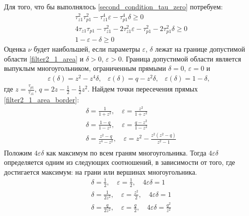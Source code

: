 \documentclass[a4paper,14pt]{article} %
\begin{document}
Для того, что бы выполнялось \eqref{second_condition_tau_zero} потребуем: 
 \begin{equation}\label{filter2_1_area}
 \begin{aligned}
&\tau_{z1}^2\tau_{p1}^2 - \tau_{z1}^4\varepsilon - \tau_{p1}^4\delta \geqslant 0\\
&4\tau_{z1}\tau_{p1} - \tau_{z1}^2 - 2\tau_{z1}^2\varepsilon - \tau_{p1}^2 - 2\tau_{p1}^2\delta \geqslant 0\\
&1-\varepsilon - \delta \geqslant 0
 \end{aligned}
\end{equation}
Оценка $\nu$ будет наибольшей, если параметры $\varepsilon$, $\delta$ лежат на границе допустимой области \eqref{filter2_1_area} и $\delta > 0$, $\varepsilon > 0$. Граница допустимой области является  выпуклым многоугольником, ограниченным прямыми $\delta = 0$, $\varepsilon = 0$ и
 \begin{equation}\label{filter2_1_area_border}
\begin{aligned}
\varepsilon(\delta)=z^2 - z^4\delta \text{,} \quad \varepsilon(\delta)=q - z^2\delta \text{,}
\quad \varepsilon(\delta)=1 - \delta \text{,}
\end{aligned}
\end{equation}
где $z = \frac{\tau_{p1}}{\tau_{z1}}$, $q = 2z - \frac{1}{2} - \frac{1}{2}z^2$. Найдем точки пересечения прямых \eqref{filter2_1_area_border}:
  \begin{equation}
 \begin{aligned}
&\delta = \frac{1}{1+z^2}, \quad \varepsilon = \frac{z^2}{1+z^2}\\
&\delta = \frac{1-q}{1-z^2}, \quad  \varepsilon = \frac{q-z^2}{1-z^2}\\
&\delta = \frac{z^2-q}{z^4-z^2}, \quad  \varepsilon = z^2 - \frac{z^2(z^2-q)}{z^2-1}\\
 \end{aligned}
\end{equation}
Положим $4\varepsilon\delta$ как максимум по всем граням многоугольника. Тогда $4\varepsilon\delta$ определяется одним из следующих соотношений, в зависимости от того, где достигается максимум: на грани или вершинах многоугольника.
  \begin{equation}
 \begin{aligned}
&\delta = \frac{1}{2}, \quad \varepsilon = \frac{1}{2}, \quad 4\varepsilon\delta = 1\\
&\delta = \frac{1}{2z^2}, \quad \varepsilon = \frac{z^2}{2}, \quad 4\varepsilon\delta = 1\\
&\delta = \frac{q}{2z^2}, \quad \varepsilon = \frac{q}{2}, \quad 4\varepsilon\delta = \frac{q^2}{z^2}\\
 \end{aligned}
\end{equation}
\end{document}
